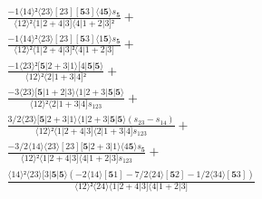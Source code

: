 \documentclass[varwidth, border=5pt]{standalone}
\begin{document}
\begin{my}
$\begin{gathered}
\scriptscriptstyle\frac{-1⟨14⟩²⟨23⟩[23][𝟓3]⟨4𝟓⟩s_{𝟓}}{⟨12⟩²⟨1|2+4|3]⟨4|1+2|3]²} +\\
\scriptscriptstyle\frac{-1⟨14⟩²⟨23⟩[23][𝟓3]⟨1𝟓⟩s_{𝟓}}{⟨12⟩²⟨1|2+4|3]²⟨4|1+2|3]} +\\
\scriptscriptstyle\frac{-1⟨23⟩²[𝟓|2+3|1⟩[4|𝟓|𝟓⟩}{⟨12⟩²⟨2|1+3|4]²} +\\
\scriptscriptstyle\frac{-3⟨23⟩[𝟓|1+2|3⟩⟨1|2+3|𝟓|𝟓⟩}{⟨12⟩²⟨2|1+3|4]s_{123}} +\\
\scriptscriptstyle\frac{3/2⟨23⟩[𝟓|2+3|1⟩⟨1|2+3|𝟓|𝟓⟩(s_{23}-s_{14})}{⟨12⟩²⟨1|2+4|3]⟨2|1+3|4]s_{123}} +\\
\scriptscriptstyle\frac{-3/2⟨14⟩⟨23⟩[23][𝟓|2+3|1⟩⟨4𝟓⟩s_{𝟓}}{⟨12⟩²⟨1|2+4|3]⟨4|1+2|3]s_{123}} +\\
\scriptscriptstyle\frac{⟨14⟩²⟨23⟩[3|𝟓|𝟓⟩(-2⟨14⟩[𝟓1]-7/2⟨24⟩[𝟓2]-1/2⟨34⟩[𝟓3])}{⟨12⟩²⟨24⟩⟨1|2+4|3]⟨4|1+2|3]} \phantom{+}
\end{gathered}$
\end{my}
\end{document}
